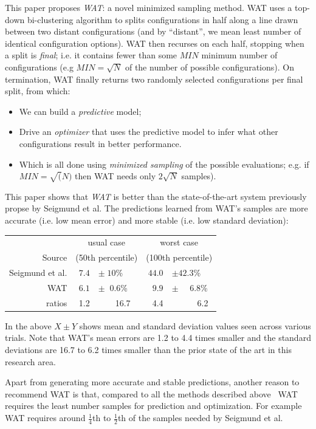 \documentclass{sig-alternative}
\newcommand{\bi}{\begin{itemize}}%
\newcommand{\ei}{\end{itemize}}
\begin{document}
 
 This paper proposes {\em WAT}:  a novel minimized sampling method.
 WAT uses a top-down bi-clustering algorithm to splits  configurations in half along a line
drawn between two  distant configurations (and by ``distant'', we mean least number of
identical configuration options). 
WAT then recurses on each half, stopping when a split is {\em final};
i.e. it contains fewer than some  $\mathit{MIN}$ minimum number of configurations (e.g $\mathit{MIN}=\sqrt{N}$ of
the number of possible configurations).
On termination, WAT finally returns two randomly selected configurations per final split,
from which:
\bi
\item We can build a {\em predictive} model;
\item Drive an {\em optimizer} that uses the predictive model to infer what other configurations result in better performance.
\item Which is all done using {\em minimized sampling} of the possible evaluations;
e.g. if $\mathit{MIN}=\sqrt(N)$ then WAT needs only $2\sqrt{N}$ samples).
\ei
This paper shows that {\em WAT} is better than the state-of-the-art system
previously propse by Seigmund et al. The predictions learned from WAT's
samples are more   accurate (i.e. low mean error) and  more stable (i.e. low standard deviation):
\begin{center}
\begin{tabular}{rr@{~}lr@{~}l}
         & \multicolumn{2}{c}{usual case} & \multicolumn{2}{c}{worst case} \\
  Source & \multicolumn{2}{c}{(50th percentile)}    & \multicolumn{2}{c}{(100th percentile)} \\\hline
 Seigmund et al. &  $7.4$& $\pm \;10$\%  &  $44.0$ & $\pm 42.3$\%\\
WAT &  $6.1$& $\pm \;\;0.6$\% &  $9.9$&  $\pm$~~ $6.8$\%\\\hline
ratios   & 1.2 & ~~~~16.7          & 4.4 & ~~~~~~6.2
  \end{tabular}
  \end{center}
In the above $X \pm Y$ shows mean and  standard deviation values seen across various trials. Note that
 WAT's mean errors are   1.2 to 4.4 times smaller and
 the standard deviations are 16.7 to 6.2   times smaller than the prior state of the art in this 
 research area.
 
Apart from generating more accurate and stable predictions,  
another reason to recommend WAT is that, compared to all the methods described above~\cite{%
siegmund2012predicting,%
zhang2015performance,%
guo2013variability,%
westermann2012automated,%
sarkar2015cos}
WAT requires
the least number  samples for prediction and optimization.
For example WAT requires  around   $\frac{1}{4}$th to $\frac{1}{2}$th
of the samples needed by  Seigmund et al.
\end{document}
